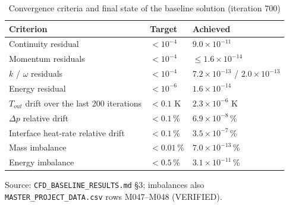 \begin{table}[htbp]
\centering
\footnotesize
\caption{Convergence criteria and final state of the baseline solution (iteration 700)}
\label{tab:convcrit}
\begin{tabular}{lll}
\toprule
Criterion & Target & Achieved \\
\midrule
Continuity residual & $< 10^{-4}$ & $9.0\times10^{-11}$ \\
Momentum residuals & $< 10^{-4}$ & $\le 1.6\times10^{-14}$ \\
$k$ / $\omega$ residuals & $< 10^{-4}$ & $7.2\times10^{-13}$ / $2.0\times10^{-13}$ \\
Energy residual & $< 10^{-6}$ & $1.6\times10^{-14}$ \\
$T_{out}$ drift over the last 200 iterations & $< 0.1$ K & $2.3\times10^{-6}$ K \\
$\Delta p$ relative drift & $< 0.1$\,\% & $6.9\times10^{-8}$\,\% \\
Interface heat-rate relative drift & $< 0.1$\,\% & $3.5\times10^{-7}$\,\% \\
Mass imbalance & $< 0.01$\,\% & $7.0\times10^{-13}$\,\% \\
Energy imbalance & $< 0.5$\,\% & $3.1\times10^{-11}$\,\% \\
\bottomrule
\end{tabular}
\par\smallskip\parbox{\linewidth}{\footnotesize\raggedright Source: \texttt{CFD\_BASELINE\_RESULTS.md} \S3; imbalances also \texttt{MASTER\_PROJECT\_DATA.csv} rows M047--M048 (VERIFIED).}
\end{table}
